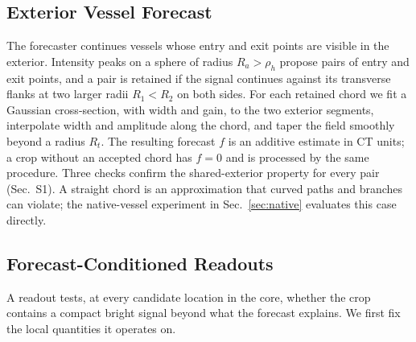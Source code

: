 \subsection{Exterior Vessel Forecast}
\label{sec:forecast}
The forecaster continues vessels whose entry and exit points are visible in the exterior. Intensity peaks on a sphere of radius $R_a>\rho_h$ propose pairs of entry and exit points, and a pair is retained if the signal continues against its transverse flanks at two larger radii $R_1<R_2$ on both sides. For each retained chord we fit a Gaussian cross-section, with width and gain, to the two exterior segments, interpolate width and amplitude along the chord, and taper the field smoothly beyond a radius $R_t$. The resulting forecast $f$ is an additive estimate in CT units; a crop without an accepted chord has $f=0$ and is processed by the same procedure. Three checks confirm the shared-exterior property for every pair (Sec.~S1). A straight chord is an approximation that curved paths and branches can violate; the native-vessel experiment in Sec.~\ref{sec:native} evaluates this case directly.

\subsection{Forecast-Conditioned Readouts}
\label{sec:readout}
A readout tests, at every candidate location in the core, whether the crop contains a compact bright signal beyond what the forecast explains. We first fix the local quantities it operates on.

